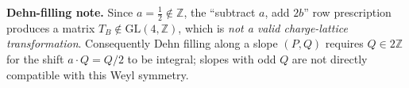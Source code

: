 \documentclass[12pt,a4paper]{article}
\newcommand{\ZZ}{\mathbb{Z}}
\theoremstyle{definition}
\begin{document}
\medskip
\textbf{Dehn-filling note.}
Since $a = \tfrac{1}{2} \notin \ZZ$, the ``subtract $a$, add $2b$'' row
prescription produces a matrix $T_B \notin \mathrm{GL}(4,\ZZ)$, which is
\emph{not a valid charge-lattice transformation}.
Consequently Dehn filling along a slope $(P,Q)$ requires $Q \in 2\ZZ$
for the shift $a \cdot Q = Q/2$ to be integral; slopes with odd $Q$
are not directly compatible with this Weyl symmetry.
\end{document}
